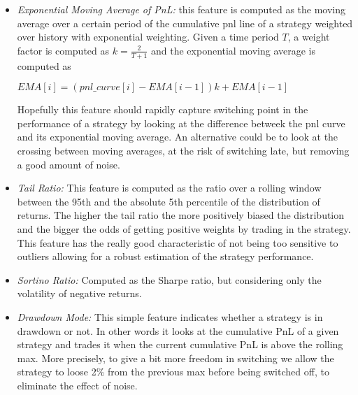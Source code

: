 \begin{itemize}
	\item \textit{Exponential Moving Average of PnL:} this feature is computed as the moving average over a certain period of the cumulative pnl line of a strategy weighted over history with exponential weighting. Given a time period $T$, a weight factor is computed as $k = \frac{2}{T+1}$ and the exponential moving average is computed as\\
	
	\begin{center} 
		$\displaystyle EMA[i] =  \left(pnl\_curve[i] - EMA[i-1]\right)k + EMA[i-1]$
	\end{center}
	
	Hopefully this feature should rapidly capture switching point in the performance of a strategy by looking at the difference betweek the pnl curve and its exponential moving average. An alternative could be to look at the crossing between moving averages, at the risk of switching late, but removing a good amount of noise.\\
	
	\item \textit{Tail Ratio:} This feature is computed as the ratio over a rolling window between the 95th and the absolute 5th percentile of the distribution of returns. The higher the tail ratio the more positively biased the distribution and the bigger the odds of getting positive weights by trading in the strategy. This feature has the really good characteristic of not being too sensitive to outliers allowing for a robust estimation of the strategy performance.\\
	
	\item \textit{Sortino Ratio:} Computed as the Sharpe ratio, but considering only the volatility of negative returns.\\ 
	
	\item \textit{Drawdown Mode:} This simple feature indicates whether a strategy is in drawdown or not. In other words it looks at the cumulative PnL of a given strategy and trades it when the current cumulative PnL is above the rolling max. More precisely, to give a bit more freedom in switching we allow the strategy to loose 2\% from the previous max before being switched off, to eliminate the effect of noise.\\
	 
\end{itemize}
